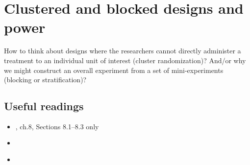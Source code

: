 \documentclass[10pt]{article}
\providecommand{\tightlist}{%
  \setlength{\itemsep}{0pt}\setlength{\parskip}{0pt}}
\begin{document}
\section{Clustered and blocked designs and power}

How to think about designs where the researchers cannot directly administer a
treatment to an individual unit of interest (cluster randomization)?  And/or
why we might construct an overall experiment from a set of mini-experiments
(blocking or stratification)?




\subsection{Useful readings}

\begin{itemize}
    \tightlist
    \item {}, ch.8, Sections 8.1--8.3 only
    \item \href{https://www.journals.uchicago.edu/doi/pdfplus/10.1017/S0022381611001368}{}
    \item \href{https://doi.org/10.1093/qje/qjaa039}{}
\end{itemize}


\end{document}
